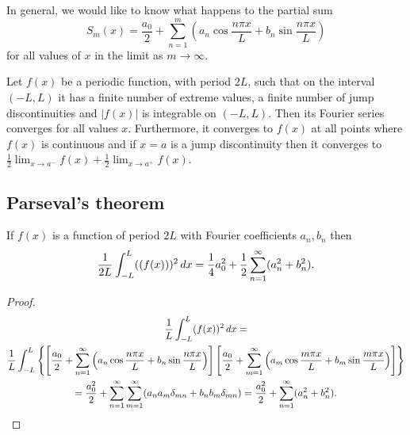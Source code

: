 \documentclass[10pt, a4paper]{article}
\begin{document}
In general,
we would like to know what happens to the partial sum
\[
S_m(x) = \frac{a_0}{2} + \sum_{n = 1}^{m}\left(a_n\cos{\frac{n\pi x}{L}} + b_n\sin{\frac{n\pi x}{L}}\right)
\]
for all values of $x$ in the limit as $m \rightarrow \infty$.

\begin{theorem}
    Let $f(x)$ be a periodic function,
    with period $2L$,
    such that on the interval $(-L, L)$ it has a finite number of extreme values,
    a finite number of jump discontinuities and $|f(x)|$ is integrable on $(-L, L)$.
    Then its Fourier series converges for all values $x$.
    Furthermore,
    it converges to $f(x)$ at all points where $f(x)$ is continuous and if $x = a$ is a jump discontinuity then it converges to $\frac{1}{2}\lim_{x \rightarrow a ^ {-}}f(x) + \frac{1}{2}\lim_{x \rightarrow a ^ {+}}f(x)$.
\end{theorem}

\subsection{Parseval’s theorem}

\begin{theorem}
    If $f(x)$ is a function of period $2L$ with Fourier coefficients $a_n, b_n$ then
    \[
    \frac{1}{2L}\int_{-L}^{L}((f(x))) ^ 2\,dx = \frac{1}{4}a_0 ^ 2 + \frac{1}{2}\infsum[n = 1](a_n ^ 2 + b_n ^ 2).
    \]
    \begin{proof}
        \begin{gather*}
            \frac{1}{L}\int_{-L}^{L}(f(x)) ^ 2\,dx = \\
            \frac{1}{L}\int_{-L}^{L}\left\{\left[\frac{a_0}{2} + \infsum[n = 1]\left(a_n\cos{\frac{n\pi x}{L}} + b_n\sin{\frac{n\pi x}{L}}\right)\right]\left[\frac{a_0}{2} + \infsum[m = 1]\left(a_m\cos{\frac{m\pi x}{L}} + b_m\sin{\frac{m\pi x}{L}}\right)\right]\right\} \\
            = \frac{a_0 ^ 2}{2} + \infsum[n = 1]\infsum[m = 1](a_na_m\delta_{mn} + b_nb_m\delta_{mn}) = \frac{a_0 ^ 2}{2} + \infsum[n = 1](a_n ^ 2 + b_n ^ 2).
        \end{gather*}
    \end{proof}
\end{theorem}
\end{document}
